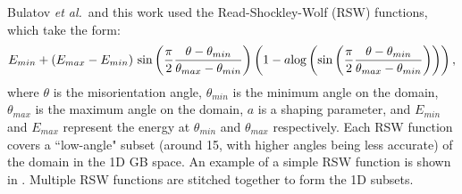 \documentclass[twoside,senior]{BYUPhys}
\begin{document}
Bulatov \emph{et al.}\ and this work used the Read-Shockley-Wolf (RSW) functions,\cite{wolf1989} which take the form:
\begin{equation}
E_{min} + (E_{max} - E_{min})\ \textnormal{sin}\left(\frac{\pi}{2}\frac{\theta-\theta_{min}}{\theta_{max} - \theta_{min}}\right)\left(1-a\textnormal{log}\left(\textnormal{sin}\left(\frac{\pi}{2}\frac{\theta-\theta_{min}}{\theta_{max} - \theta_{min}}\right)\right)\right),
\end{equation}
where $\theta$ is the misorientation angle, $\theta_{min}$ is the minimum angle on the domain, $\theta_{max}$ is the maximum angle on the domain, $a$ is a shaping parameter, and $E_{min}$ and $E_{max}$ represent the energy at $\theta_{min}$ and $\theta_{max}$ respectively.  Each RSW function covers a ``low-angle" subset (around 15\textdegree{}, with higher angles being less accurate)\cite{rohrer2011,wolf1989} of the domain in the 1D GB space.  An example of a simple RSW function is shown in .  Multiple RSW functions are stitched together to form the 1D subsets.
\end{document}
